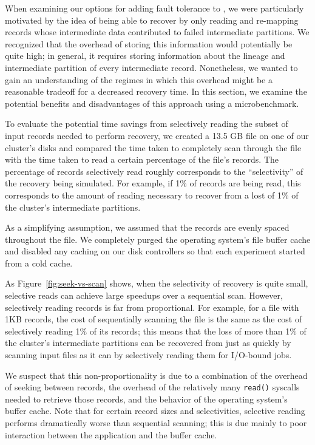 When examining our options for adding fault tolerance to \themis, we were
particularly motivated by the idea of being able to recover by only reading and
re-mapping records whose intermediate data contributed to failed intermediate
partitions. We recognized that the overhead of storing this information would
potentially be quite high; in general, it requires storing information about
the lineage and intermediate partition of every intermediate
record. Nonetheless, we wanted to gain an understanding of the regimes in which
this overhead might be a reasonable tradeoff for a decreased recovery time. In
this section, we examine the potential benefits and disadvantages of this
approach using a microbenchmark.

To evaluate the potential time savings from selectively reading the subset of
input records needed to perform recovery, we created a 13.5 GB file on one of
our cluster's disks and compared the time taken to completely scan through the
file with the time taken to read a certain percentage of the file's
records. The percentage of records selectively read roughly corresponds to the
``selectivity'' of the recovery being simulated. For example, if 1\% of records
are being read, this corresponds to the amount of reading necessary to recover
from a lost of 1\% of the cluster's intermediate partitions.

As a simplifying assumption, we assumed that the records are evenly spaced
throughout the file. We completely purged the operating system's file buffer
cache and disabled any caching on our disk controllers so that each experiment
started from a cold cache.

As Figure~\ref{fig:seek-vs-scan} shows, when the selectivity of recovery is
quite small, selective reads can achieve large speedups over a sequential
scan. However, selectively reading records is far from proportional. For
example, for a file with 1KB records, the cost of sequentially scanning the
file is the same as the cost of selectively reading 1\% of its records; this
means that the loss of more than 1\% of the cluster's intermediate partitions
can be recovered from just as quickly by scanning input files as it can by
selectively reading them for I/O-bound jobs.

We suspect that this non-proportionality is due to a combination of the
overhead of seeking between records, the overhead of the relatively many
\texttt{read()} syscalls needed to retrieve those records, and the behavior of
the operating system's buffer cache. Note that for certain record sizes and
selectivities, selective reading performs dramatically worse than sequential
scanning; this is due mainly to poor interaction between the application and
the buffer cache.

